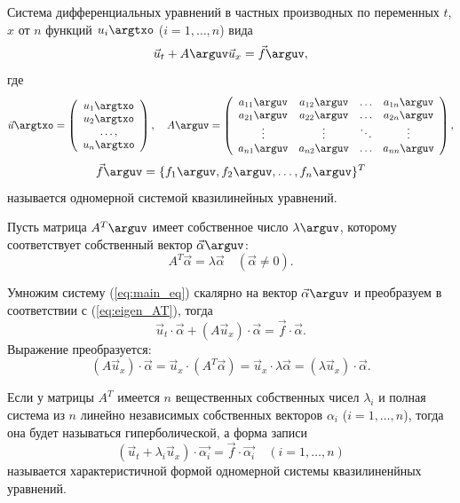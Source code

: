 \documentclass[a4paper, 14pt]{extarticle}
\begin{document}
\begin{dfn}
		Система  дифференциальных уравнений в частных производных по переменных $t$, $x$ от $n$ функций $u_i\argtxo$ ($i=1,\ldots,n$) вида
		\begin{equation}
			\label{eq:main_eq}
			\vec{u}_t +  A\arguv \vec{u}_x = \vec{f}\arguv,
		\end{equation}
		где
		\[
		\vec{u}\argtxo =  \left(
		\begin{array}{c}
			 u_1\argtxo \\
			 u_2\argtxo \\
			 \ldots, \\
			 u_n\argtxo 
		\end{array}
		\right),\quad
		A\arguv =  \left(
		\begin{array}{cccc}
			a_{11}\arguv & a_{12}\arguv  & \ldots & a_{1n}\arguv\\
			a_{21}\arguv & a_{22}\arguv  & \ldots & a_{2n}\arguv\\
			\vdots          & \vdots           & \ddots & \vdots \\
			a_{n1}\arguv & a_{n2}\arguv  & \ldots & a_{nn}\arguv\\
		\end{array}
		\right),
		\]
		\[
		\vec{f}\arguv = \{ f_1\arguv, f_2\arguv, \ldots, f_n\arguv \}^T
		\]
	называется одномерной системой квазилинейных уравнений.
\end{dfn}

Пусть матрица $A^T\arguv$ имеет собственное число $\lambda\arguv$, которому соответствует собственный вектор $\vec{\alpha}\arguv$:
\begin{equation}
	\label{eq:eigen_AT}
	A^T \vec{\alpha} = \lambda \vec{\alpha} \quad (\vec{\alpha} \neq 0).
\end{equation}

Умножим систему (\ref{eq:main_eq}) скалярно на вектор $\vec{\alpha}\arguv$ и преобразуем в соответствии с (\ref{eq:eigen_AT}), тогда
\[
\vec{u}_t\cdot\vec{\alpha} +  (A \vec{u}_x) \cdot\vec{\alpha} = \vec{f}\cdot\vec{\alpha}.
\]
Выражение преобразуется:
\[
(A \vec{u}_x) \cdot\vec{\alpha} = \vec{u}_x \cdot (A^T\vec{\alpha}) = \vec{u}_x \cdot\lambda \vec{\alpha} = (\lambda  \vec{u}_x) \cdot\vec{\alpha}.
\]

\begin{dfn}
\label{dfn:hyperbolic}
Если у матрицы $A^T$ имеется $n$ вещественных собственных чисел $\lambda_i$ и полная система из $n$ линейно независимых собственных векторов $\alpha_i$ ($i=1,\ldots,n$), тогда она  будет называться \alert{гиперболической}, а форма записи 
\begin{equation}
	\label{eq:main_character}
	(\vec{u}_t + \lambda_i \vec{u}_x)	\cdot \vec{\alpha_i} = \vec{f}\cdot\vec{\alpha_i}\quad (i=1,\ldots,n)
\end{equation}
называется характеристичной формой одномерной системы квазилиненйных уравнений.
\end{dfn}
\end{document}
